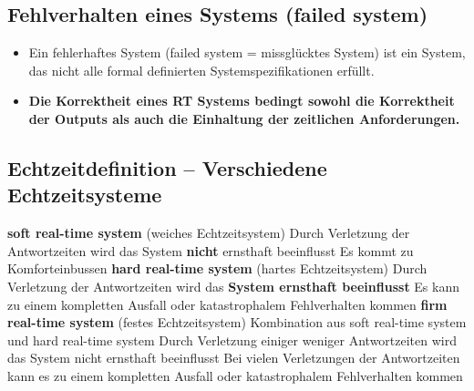 


\subsection{Fehlverhalten eines Systems (failed system)}

\begin{itemize}
    \item Ein fehlerhaftes System (failed system = missglücktes System) ist ein System, das nicht alle formal
        definierten Systemspezifikationen erfüllt.
    \item \textbf{Die Korrektheit eines RT Systems bedingt sowohl die Korrektheit der Outputs als auch die Einhaltung
        der zeitlichen Anforderungen.}
\end{itemize}


\subsection{Echtzeitdefinition -- Verschiedene Echtzeitsysteme}

\begin{outline}
    \1 \textbf{soft real-time system} (weiches Echtzeitsystem)
        \2 Durch Verletzung der Antwortzeiten wird das System \textbf{nicht} ernsthaft beeinflusst
        \2 Es kommt zu Komforteinbussen
    \1 \textbf{hard real-time system} (hartes Echtzeitsystem)
        \2 Durch Verletzung der Antwortzeiten wird das \textbf{System ernsthaft beeinflusst}
        \2 Es kann zu einem kompletten Ausfall oder katastrophalem Fehlverhalten kommen
    \1 \textbf{firm real-time system} (festes Echtzeitsystem)
        \2 Kombination aus soft real-time system und hard real-time system
        \2 Durch Verletzung einiger weniger Antwortzeiten wird das System nicht ernsthaft beeinflusst
        \2 Bei vielen Verletzungen der Antwortzeiten kann es zu einem kompletten Ausfall oder katastrophalem Fehlverhalten kommen
\end{outline}


